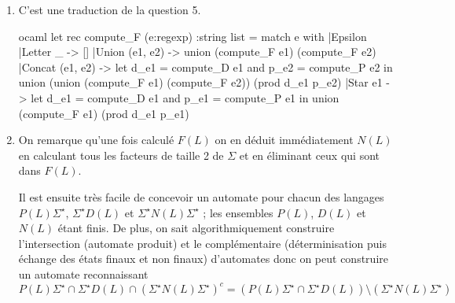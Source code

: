 \documentclass[a4paper, 11pt]{article}
\newenvironment{code-env}
{
  \mdfsetup{
    roundcorner=2pt,
    topline=true,
    leftline=true,
    bottomline=true,
    rightline=true,
    innertopmargin=4pt,
    innerbottommargin=4pt,
    innerrightmargin=4pt,
    innerlinewidth=1pt,
    backgroundcolor={gray!10},
    linecolor={gray!40},
    linewidth=0.1pt,
  }
  \begin{mdframed}[]
  }{\end{mdframed}}
\newenvironment{fancy-code}[1]
  {\VerbatimEnvironment
    \begin{code-env}
    \begin{verbatim}}
 {\end{verbatim}\end{code-env}}
\begin{document}
\begin{enumerate}
\begin{fancy-code}{ocaml}
let rec prod (l1:string list) (l2:string list) = match l1, l2 with
  |[], _ |_, [] -> []
  |t::q, l -> union (List.map (fun x -> t^x) l) (prod q l)
\end{fancy-code}
\item C'est une traduction de la question 5.
\smallskip

\begin{fancy-code}{ocaml}
let rec compute_F (e:regexp) :string list = match e with
  |Epsilon |Letter _ -> []
  |Union (e1, e2) -> union (compute_F e1) (compute_F e2)
  |Concat (e1, e2) ->
     let d_e1 = compute_D e1 and p_e2 = compute_P e2 in
     union (union (compute_F e1) (compute_F e2)) (prod d_e1 p_e2)
  |Star e1 ->
     let d_e1 = compute_D e1 and p_e1 = compute_P e1 in
     union (compute_F e1) (prod d_e1 p_e1)
\end{fancy-code}


\item On remarque qu'une fois calculé $F(L)$ on en déduit immédiatement $N(L)$ en calculant tous les facteurs de taille 2 de $\Sigma$ et en éliminant ceux qui sont dans $F(L)$. 

Il est ensuite très facile de concevoir un automate pour chacun des langages $P(L)\Sigma^{\star}$, $\Sigma^{\star}D(L)$ et $\Sigma^{\star}N(L)\Sigma^{\star}$ ; les ensembles $P(L)$, $D(L)$ et $N(L)$ étant finis. De plus, on sait algorithmiquement construire l'intersection (automate produit) et le complémentaire (déterminisation puis échange des états finaux et non finaux) d'automates donc on peut construire un automate reconnaissant \[P(L)\Sigma^{\star} \cap \Sigma^{\star}D(L) \cap (\Sigma^{\star}N(L)\Sigma^{\star})^c = (P(L)\Sigma^{\star} \cap \Sigma^{\star}D(L)) \setminus (\Sigma^{\star}N(L)\Sigma^{\star})  \]


\end{enumerate}
\end{document}
